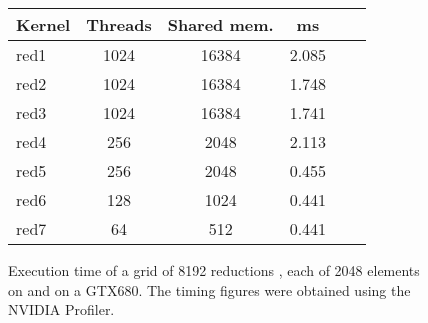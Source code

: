 

\begin{figure} 
\begin{small}
\centering
\begin{tabular}{| l | c | c | c | c | r | }
\hline 
  Kernel & Threads & Shared mem. & ms \\ \hline 
  red1 & 1024 & 16384 & 2.085 \\ \hline
  red2 & 1024 & 16384 & 1.748 \\ \hline
  red3 & 1024 & 16384 & 1.741 \\ \hline
  red4 & 256 & 2048  & 2.113  \\ \hline
  red5 & 256 & 2048  & 0.455  \\ \hline
  red6 & 128 & 1024  & 0.441  \\ \hline
  red7 & 64 & 512    & 0.441  \\ \hline
\end{tabular}
\caption{ Execution time of a grid of 8192 reductions , each of
2048 elements on 
and on a GTX680. The timing figures were obtained using the NVIDIA Profiler.}
\label{fig:reducetable} 
\end{small} 
\end{figure} 


